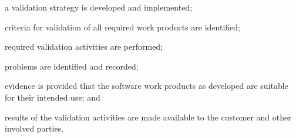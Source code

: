 			\begin{adjustwidth}{2em}{0pt} 

				\begin{compactitem}

					\item a validation strategy is developed and implemented;

					\item criteria for validation of all required work products are identified;

					\item required validation activities are performed;

					\item problems are identified and recorded;

					\item evidence is provided that the software work products as developed are suitable for their intended use; and

					\item results of the validation activities are made available to the customer and other involved parties.

				\end{compactitem}

			\end{adjustwidth}

